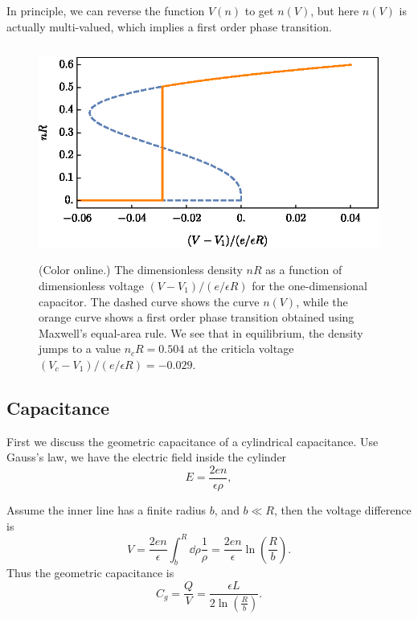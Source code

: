 \documentclass[10pt]{article}
\begin{document}
In principle, we can reverse the function $V(n)$ to get $n(V)$, but here $n(V)$ is actually multi-valued, which implies a first order phase transition.

\begin{figure}[H]
	\centering
	\includegraphics[height=7cm]{phase_transition.eps}
	\caption{(Color online.) The dimensionless density $nR$ as a function of dimensionless voltage $(V-V_1)/(e/\epsilon R)$ for the one-dimensional capacitor. The dashed curve shows the curve $n(V)$, while the orange curve shows a first order phase transition obtained using Maxwell's equal-area rule. We see that in equilibrium, the density jumps to a value $n_c R = 0.504$ at the criticla voltage $(V_c-V_1)/(e/\epsilon R) = -0.029$.}
	\label{fig: 3}
\end{figure}

\subsection{Capacitance}

First we discuss the geometric capacitance of a cylindrical capacitance. Use Gauss's law, we have the electric field inside the cylinder
\begin{equation}
	E = \frac{2en}{\epsilon \rho},
\end{equation}

Assume the inner line has a finite radius $b$, and $b \ll R$, then the voltage difference is
\begin{equation}
	V = \frac{2en}{\epsilon} \int_b^R \dd{\rho} \frac{1}{\rho} = \frac{2en}{\epsilon} \ln(\frac{R}{b}).
\end{equation}
Thus the geometric capacitance is
\begin{equation}
	C_g = \frac{Q}{V} = \frac{\epsilon L}{2 \ln(\frac{R}{b})}.
\end{equation}
\end{document}

